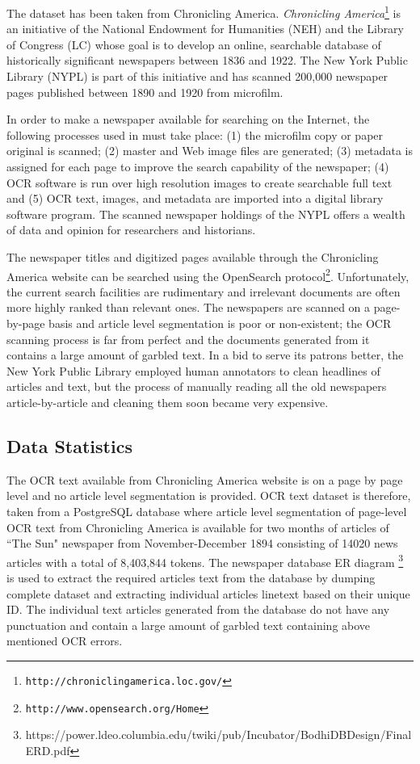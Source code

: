 \documentclass[12pt]{article}
\begin{document}
The dataset has been taken from Chronicling America.
\noindent \emph{Chronicling
America}\footnote{\texttt{http://chroniclingamerica.loc.gov/}} is an
initiative of the National Endowment for Humanities (NEH) and the
Library of Congress (LC) whose goal is to develop an online,
searchable database of historically significant newspapers between
1836 and 1922. The New York Public Library (NYPL) is part of this
initiative and has scanned 200,000 newspaper pages published between
1890 and 1920 from microfilm.

In order to make a newspaper available for searching on the Internet,
the following processes used in \cite{dutta2011learning} must take place: (1) the microfilm copy or
paper original is scanned; (2) master and Web image files are
generated; (3) metadata is assigned for each page to improve the
search capability of the newspaper; (4) OCR software is run over high
resolution images to create searchable full text and (5) OCR text,
images, and metadata are imported into a digital library software
program. The scanned newspaper holdings of the NYPL offers a wealth of
data and opinion for researchers and historians.

The newspaper titles and digitized pages available through the
Chronicling America website can be searched using the OpenSearch
protocol\footnote{\texttt{http://www.opensearch.org/Home}}.
Unfortunately, the current search facilities are rudimentary and
irrelevant documents are often more highly ranked than relevant ones.
The newspapers are scanned on a page-by-page basis and article level
segmentation is poor or non-existent; the OCR scanning process is far
from perfect and the documents generated from it contains a large
amount of garbled text. In a bid to serve its patrons better, the New
York Public Library employed human annotators to clean headlines of
articles and text, but the process of manually reading all the old
newspapers article-by-article and cleaning them soon became very
expensive. 
\subsection{Data Statistics}
The OCR text available from Chronicling America website is on a page by page level and no article level segmentation is provided. OCR text dataset is therefore, taken from a PostgreSQL database where article level segmentation of page-level OCR text from Chronicling America is available for two months of articles of ``The Sun" newspaper from November-December 1894 consisting of 14020 news articles with a total of 8,403,844 tokens. The newspaper database ER diagram \footnote{https://power.ldeo.columbia.edu/twiki/pub/Incubator/BodhiDBDesign/Final ERD.pdf }
is used to extract the required articles text from the database by dumping complete dataset and extracting individual articles linetext based on their unique ID. The individual text articles generated from the database do not have any punctuation and contain a large amount of garbled text containing above mentioned OCR errors.
\end{document}
